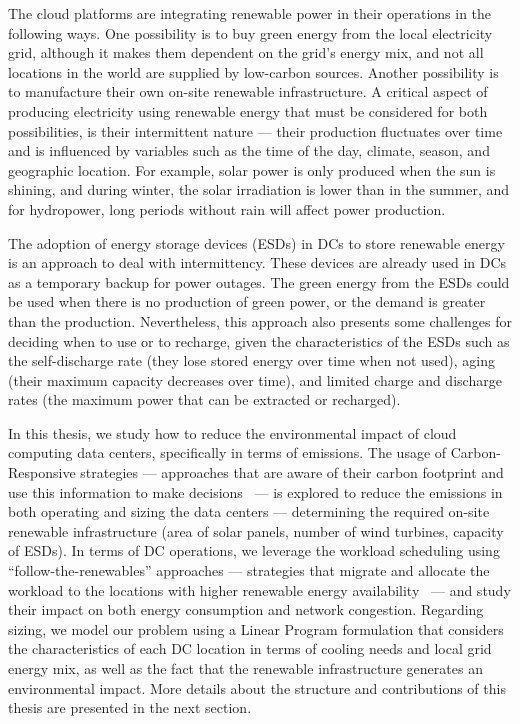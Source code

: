 The cloud platforms are integrating renewable power in their operations in the following ways. One possibility is to buy green energy from the local electricity grid, although it makes them dependent on the grid's energy mix, and not all locations in the world are supplied by low-carbon sources. Another possibility is to manufacture their own on-site renewable infrastructure. A critical aspect of producing electricity using renewable energy that must be considered for both possibilities,  is their intermittent nature --- their production fluctuates over time and is influenced by variables such as the time of the day, climate, season, and geographic location. For example, solar power is only produced when the sun is shining, and during winter, the solar irradiation is lower than in the summer, and for hydropower, long periods without rain will affect power production.


The adoption of energy storage devices (ESDs) in DCs to store renewable energy~\cite{wang2012_EDCS} is an approach to deal with intermittency. These devices are already used in DCs as a temporary backup for power outages. The green energy from the ESDs could be used when there is no production of green power, or the demand is greater than the production. Nevertheless, this approach also presents some challenges for deciding when to use or to recharge, given the characteristics of the ESDs such as the self-discharge rate (they lose stored energy over time when not used), aging (their maximum capacity decreases over time), and limited charge and discharge rates (the maximum power that can be extracted or recharged).

In this thesis, we study how to reduce the environmental impact of cloud computing data centers, specifically in terms of  emissions. The usage of Carbon-Responsive strategies --- approaches that are aware of their carbon footprint and use this information to make decisions~\cite{schooler2021carbonaware} --- is explored to reduce the  emissions in both operating and sizing the data centers ---  determining the required on-site renewable infrastructure (area of solar panels, number of wind turbines, capacity of ESDs). In terms of DC operations, we leverage the workload scheduling using ``follow-the-renewables'' approaches --- strategies that migrate and allocate the workload to the locations with higher renewable energy availability~\cite{shuja2016sustainable} --- and study their impact on both energy consumption and network congestion. Regarding sizing, we model our problem using a Linear Program formulation that considers the characteristics of each DC location in terms of cooling needs and local grid energy mix, as well as the fact that the renewable infrastructure generates an environmental impact. More details about the structure and contributions of this thesis are presented in the next section.
 
